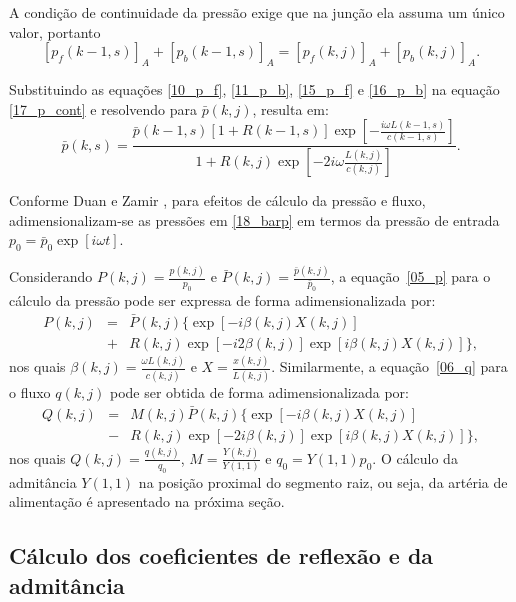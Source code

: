 \documentclass[a4paper,12pt]{monografia}
\theoremstyle{plain}
\theoremstyle{definition}
\theoremstyle{remark}
\begin{document}
A condição de continuidade da pressão exige que na junção ela assuma um único valor, portanto
\begin{equation}
	\left[ p_f(k-1,s) \right]_A + \left[ p_b (k-1,s) \right]_A = \left[ p_f(k,j) \right]_A + \left[ p_b(k,j) \right]_A.
	\label{17_p_cont}
\end{equation}

Substituindo as equações \eqref{10_p_f}, \eqref{11_p_b}, \eqref{15_p_f} e \eqref{16_p_b} na equação \eqref{17_p_cont} e resolvendo para $\bar{p}(k,j)$, resulta em:
\begin{equation}
	\bar{p} (k,s) =  \frac{\bar{p}(k-1,s)\left[1 + R(k-1,s)\right] \exp\left[ -\frac{i \omega L(k-1,s)}{c(k-1,s)}\right]}{1 + R(k,j)\exp{\left[ -2i\omega \frac{L(k,j)}{c(k,j)}\right]}}.
	\label{18_barp}
\end{equation}

Conforme Duan e Zamir \cite{Duan}, para efeitos de cálculo da pressão e fluxo, adimensionalizam-se as pressões em \eqref{18_barp} em termos da pressão de entrada $p_0 = \bar{p}_0 \exp[i\omega t]$. 

Considerando $P(k,j) = \frac{p(k,j)}{p_0}$ e $\bar{P} (k,j) = \frac{\bar{p}(k,j)}{\bar{p}_0}$, a equação~\eqref{05_p} para o cálculo da pressão  pode ser expressa de forma adimensionalizada por:
\begin{eqnarray}
	P(k,j) &=& \bar{P}(k,j)\big\{\exp[ -i\beta(k,j) X(k,j)] \nonumber \\
	& +& R(k,j) \exp[-i2\beta(k,j)] \exp[i\beta(k,j) X(k,j)]\big\},
	\label{21_P}
\end{eqnarray}
nos quais $\beta(k,j) = \frac{\omega L(k,j)}{c(k,j)}$ e $X = \frac{x(k,j)}{L(k,j)}$. Similarmente, a equação~\eqref{06_q} para o fluxo $q(k,j)$ pode ser obtida de forma adimensionalizada por:
\begin{eqnarray}
	Q(k,j) &=& M(k,j)\bar{P}(k,j)\big\{ \exp\left[ -i\beta(k,j) X(k,j) \right] \nonumber \\ 
	&-& R(k,j) \exp[ -2i\beta(k,j)] \exp[i\beta(k,j) X(k,j)] \big\},
	\label{23_Q}
\end{eqnarray}
nos quais $Q(k,j) = \frac{q (k,j)}{q_0}$, $M = \frac{Y(k,j)}{Y(1,1)}$ e $q_0 = Y(1,1)p_0$. O cálculo da admitância $Y(1,1)$ na posição proximal do segmento raiz, ou seja, da artéria de alimentação é apresentado na próxima seção.

\subsection{Cálculo dos coeficientes de reflexão e da admitância}
\end{document}
